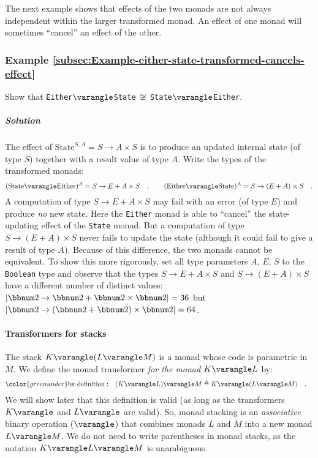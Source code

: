 The next example shows that effects of the two monads are not always
independent within the larger transformed monad. An effect of one
monad will sometimes \textsf{``}cancel\textsf{''} an effect of the other.

\subsubsection{Example \label{subsec:Example-either-state-transformed-cancels-effect}\ref{subsec:Example-either-state-transformed-cancels-effect}}

Show that \lstinline!Either!$\varangle$\lstinline!State!$\,\not\cong\,$\lstinline!State!$\varangle$\lstinline!Either!.

\subparagraph{Solution}

The effect of $\text{State}^{S,A}=S\rightarrow A\times S$ is to produce
an updated internal state (of type $S$) together with a result value
of type $A$. Write the types of the transformed monads:
\[
(\text{State}\varangle\text{Either})^{A}=S\rightarrow E+A\times S\quad,\quad\quad(\text{Either}\varangle\text{State})^{A}=S\rightarrow\left(E+A\right)\times S\quad.
\]
A computation of type $S\rightarrow E+A\times S$ may fail with an
error (of type $E$) and produce \emph{no} new state. Here the \lstinline!Either!
monad is able to \textsf{``}cancel\textsf{''} the state-updating effect of the \lstinline!State!
monad. But a computation of type $S\rightarrow(E+A)\times S$ never
fails to update the state (although it could fail to give a result
of type $A$). Because of this difference, the two monads cannot be
equivalent. To show this more rigorously, set all type parameters
$A$, $E$, $S$ to the \lstinline!Boolean! type and observe that
the types $S\rightarrow E+A\times S$ and $S\rightarrow\left(E+A\right)\times S$
have a different number of distinct values: $\left|\bbnum 2\rightarrow\bbnum 2+\bbnum 2\times\bbnum 2\right|=36$
but $\left|\bbnum 2\rightarrow\left(\bbnum 2+\bbnum 2\right)\times\bbnum 2\right|=64$.

\paragraph{Transformers for stacks}

The stack $K\varangle(L\varangle M)$ is a monad whose code is parametric
in $M$. We define the monad transformer \emph{for the monad} $K\varangle L$
by:
\begin{align*}
{\color{greenunder}\text{by definition}:}\quad & (K\varangle L)\varangle M\triangleq K\varangle(L\varangle M)\quad.
\end{align*}
We will show later that this definition is valid (as long as the transformers
$K\varangle$ and $L\varangle$ are valid). So, monad stacking is
an \emph{associative} binary operation ($\varangle$) that combines
monads $L$ and $M$ into a new monad $L\varangle M$. We do not need
to write parentheses in monad stacks, as the notation $K\varangle L\varangle M$
is unambiguous. 

